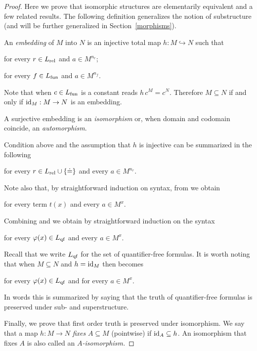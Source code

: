 \begin{proof}
Here we prove that isomorphic structures are elementarily equivalent and a few related results.
The following definition generalizes the notion of substructure (and will be further generalized in Section~\ref{morphisms}).

\begin{definition}\label{isomorfismodef}
An \emph{embedding\/} of $M$ into $N$ is an injective total map $h:M\hookrightarrow N$ such that

\hfill for every $r\in L_{\rm rel}$ and $a\in M^{n_r}$;

\hfill for every $f\in L_{\rm fun}$ and $a\in M^{n_f}$.

Note that when $c\in L_{\rm fun}$ is a constant  reads $h\,c^M=c^N$.
Therefore $M\subseteq N$ if and only if $\id_M:M\imp N$ is an embedding.

A surjective embedding is an \emph{isomorphism} or, when domain and codomain coincide, an \emph{automorphism}.
\end{definition}

Condition  above and the assumption that $h$ is injective can be summarized in the following

\hfill for every $r\in L_{\rm rel}\cup\{\doteq\}$ and every $a\in M^{n_r}$.

Note also that, by straightforward induction on syntax, from  we obtain

\hfill for every term $t(x)$ and every  $a\in M^x$.

Combining  and  we obtain by straightforward induction on the syntax

\hfill for every $\phi(x)\in L_{\rm qf}$ and every $a\in M^x$.

Recall that we write $L_{\rm qf}$ for the set of quantifier-free formulas.
It is worth noting that when $M\subseteq N$ and $h=\id_M$ then  becomes 

\hfill for every $\phi(x)\in L_{\rm qf}$ and for every $a\in M^x$.

In words this is summarized by saying that the truth of quantifier-free formulas is preserved under sub- and superstructure.

Finally, we prove that first order truth is preserved under isomorphism.
We say that a map $h:M\to N$ \emph{fixes\/} $A\subseteq M$ (pointwise) if $\id_A\subseteq h$.
An isomorphism that fixes $A$ is also called an \emph{$A$-isomorphism.}


\end{proof}
